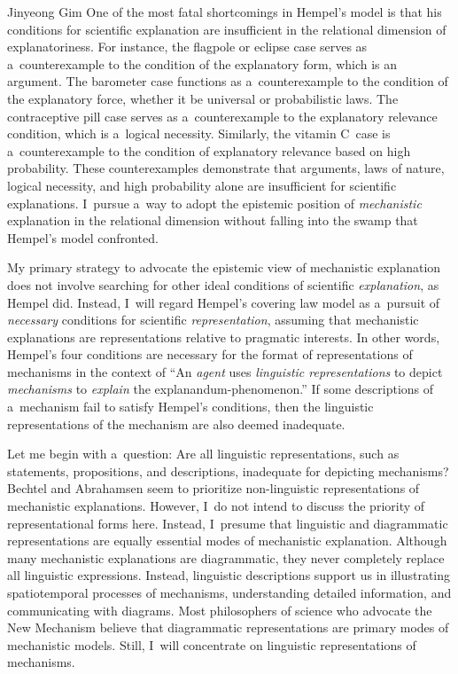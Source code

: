 \begin{artengenv}{Jinyeong Gim}
One of the most fatal shortcomings in Hempel's model is that his conditions for scientific explanation are insufficient in the relational dimension of explanatoriness. For instance, the flagpole or eclipse case serves as a~counterexample to the condition of the explanatory form, which is an argument. The barometer case functions as a~counterexample to the condition of the explanatory force, whether it be universal or probabilistic laws. The contraceptive pill case serves as a~counterexample to the explanatory relevance condition, which is a~logical necessity. Similarly, the vitamin C~case is a~counterexample to the condition of explanatory relevance based on high probability. These counterexamples demonstrate that arguments, laws of nature, logical necessity, and high probability alone are insufficient for scientific explanations. I~pursue a~way to adopt the epistemic position of \textit{mechanistic} explanation in the relational dimension without falling into the swamp that Hempel's model confronted.

My primary strategy to advocate the epistemic view of mechanistic explanation does not involve searching for other ideal conditions of scientific \textit{explanation}, as Hempel did. Instead, I~will regard Hempel's covering law model as a~pursuit of \textit{necessary} conditions for scientific \textit{representation}, assuming that mechanistic explanations are representations relative to pragmatic interests. In other words, Hempel's four conditions are necessary for the format of representations of mechanisms in the context of ``An \textit{agent} uses \textit{linguistic representations} to depict \textit{mechanisms} to \textit{explain} the explanandum-phenomenon.'' If some descriptions of a~mechanism fail to satisfy Hempel's conditions, then the linguistic representations of the mechanism are also deemed inadequate.

Let me begin with a~question: Are all linguistic representations, such as statements, propositions, and descriptions, inadequate for depicting mechanisms? Bechtel and Abrahamsen
\parencite*[][]{bechtel_explanation_2005} %
 seem to prioritize non-linguistic representations of mechanistic explanations. However, I~do not intend to discuss the priority of representational forms here. Instead, I~presume that linguistic and diagrammatic representations are equally essential modes of mechanistic explanation. Although many mechanistic explanations are diagrammatic, they never completely replace all linguistic expressions. Instead, linguistic descriptions support us in illustrating spatiotemporal processes of mechanisms, understanding detailed information, and communicating with diagrams. Most philosophers of science who advocate the New Mechanism believe that diagrammatic representations are primary modes of mechanistic models. Still, I~will concentrate on linguistic representations of mechanisms.


\end{artengenv}
